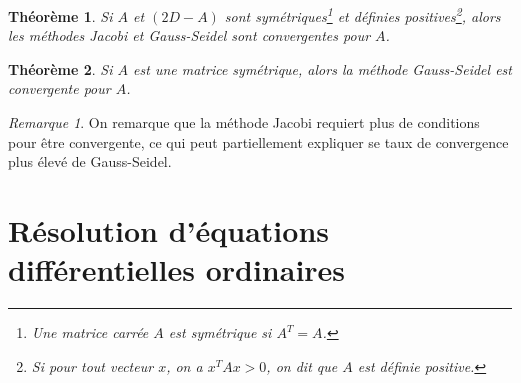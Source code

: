 \documentclass{article}
\newtheorem{thm}{Théorème}[section]
\theoremstyle{definition}
\theoremstyle{remark}
\newtheorem*{rmq}{Remarque}
\begin{document}
		\begin{thm} Si $A$ et $(2D-A)$ sont symétriques\footnote{Une matrice carrée $A$ est symétrique si $A^T = A$.} et définies positives\footnote{Si pour tout
		vecteur $x$, on a $x^TAx > 0$, on dit que $A$ est définie positive.}, alors les méthodes Jacobi et Gauss-Seidel sont convergentes pour $A$.
		\end{thm}

		\begin{thm} Si $A$ est une matrice symétrique, alors la méthode Gauss-Seidel est convergente pour $A$. \end{thm}

		\begin{rmq} On remarque que la méthode Jacobi requiert plus de conditions pour être convergente, ce qui peut partiellement expliquer se taux de
		convergence plus élevé de Gauss-Seidel.
		\end{rmq}

\newpage
\section{Résolution d'équations différentielles ordinaires}
\end{document}
